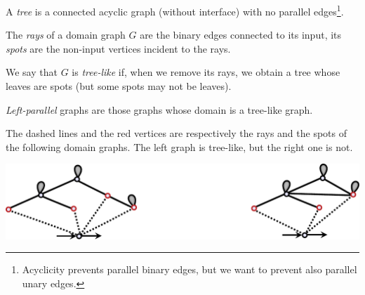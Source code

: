 \begin{definition}
A \emph{tree} is a connected acyclic graph (without interface) with no parallel edges\footnote{Acyclicity prevents parallel binary edges, but we want to prevent also parallel unary edges.}.
 
The \emph{rays} of a domain graph $G$ are the binary edges connected to its input, its \emph{spots} are the non-input vertices incident to the rays. 
 
We say that $G$ is \emph{tree-like} if, when we remove its rays, we obtain a tree whose leaves are spots  (but some spots may not be leaves).   
 
\emph{Left-parallel} graphs are those graphs whose domain is a tree-like graph.
 \end{definition}
 The dashed lines and the red vertices are respectively the rays and the spots of the following domain graphs. 
 The left graph is tree-like, but the right one is not.
  \begin{center}
\includegraphics[scale=.4]{tree-like}
\end{center}
